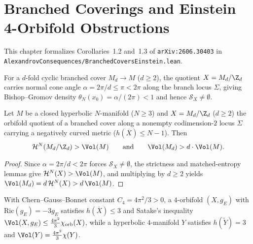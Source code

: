 \chapter{Branched Coverings and Einstein 4-Orbifold Obstructions}

This chapter formalizes Corollaries~1.2 and~1.3 of \texttt{arXiv:2606.30403} in
\texttt{AlexandrovConsequences/BranchedCoversEinstein.lean}.

\begin{definition}
\label{def_branched_cone_angle}
\leanok
For a $d$-fold cyclic branched cover $M_d \to M$ ($d \ge 2$), the quotient $X = M_d / \Z_d$
carries normal cone angle $\alpha = 2\pi / d \le \pi < 2\pi$ along the branch locus $\Sigma$,
giving Bishop--Gromov density $\theta_N(x_0) = \alpha/(2\pi) < 1$ and hence
$\mathcal{S}_X \neq \emptyset$.
\end{definition}

\begin{corollary}
\label{cor_hamenstadt_gen}
\leanok
{}
Let $M$ be a closed hyperbolic $N$-manifold ($N \ge 3$) and $X = M_d / \Z_d$ ($d \ge 2$) the
orbifold quotient of a branched cover along a nonempty codimension-$2$ locus $\Sigma$ carrying a
negatively curved metric ($h(\overline{X}) \le N - 1$). Then
\[
  \mathcal{H}^N(M_d / \Z_d) > \Vol(M) \qquad \text{and} \qquad \Vol(M_d) > d \cdot \Vol(M).
\]
\end{corollary}
\begin{proof}\leanok
Since $\alpha = 2\pi/d < 2\pi$ forces $\mathcal{S}_X \neq \emptyset$, the strictness and
matched-entropy lemmas give $\mathcal{H}^N(X) > \Vol(M)$, and multiplying by $d \ge 2$ yields
$\Vol(M_d) = d\,\mathcal{H}^N(X) > d\,\Vol(M)$.
\end{proof}

\begin{definition}
\label{def_satake_einstein_data}
\leanok
With Chern--Gauss--Bonnet constant $C_4 = 4\pi^2/3 > 0$, a $4$-orbifold $(X, g_E)$ with
$\mathrm{Ric}(g_E) = -3 g_E$ satisfies $h(\overline{X}) \le 3$ and Satake's inequality
$\Vol(X, g_E) \le \frac{4\pi^2}{3}\chi_{\mathrm{orb}}(X)$, while a hyperbolic $4$-manifold $Y$
satisfies $h(\widetilde{Y}) = 3$ and $\Vol(Y) = \frac{4\pi^2}{3}\chi(Y)$.
\end{definition}

